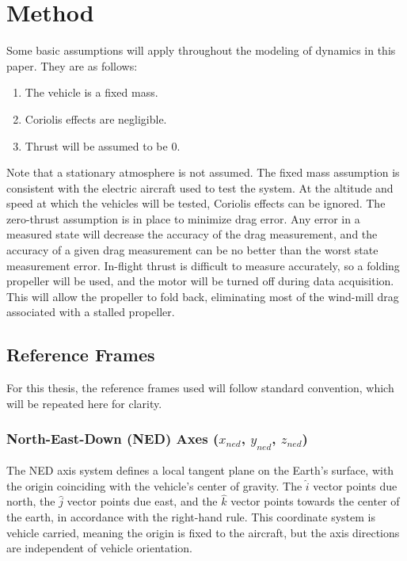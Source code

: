 \chapter{Method}
\label{background-information}
Some basic assumptions will apply throughout the modeling of dynamics in this paper. They are as follows:
\begin{enumerate}
\item The vehicle is a fixed mass.
\item Coriolis effects are negligible.
\item Thrust will be assumed to be 0.
\end{enumerate}
Note that a stationary atmosphere is not assumed. The fixed mass assumption is consistent with the electric aircraft used to test the system. At the altitude and speed at which the vehicles will be tested, Coriolis effects can be ignored\cite{klein2006aircraft}. The zero-thrust assumption is in place to minimize drag error. Any error in a measured state will decrease the accuracy of the drag measurement, and the accuracy of a given drag measurement can be no better than the worst state measurement error. In-flight thrust is difficult to measure accurately, so a folding propeller will be used, and the motor will be turned off during data acquisition. This will allow the propeller to fold back, eliminating most of the wind-mill drag associated with a stalled propeller. 

\section{Reference Frames}
For this thesis, the reference frames used will follow standard convention,\cite{klein2006aircraft} which will be repeated here for clarity.

\subsection*{North-East-Down (NED) Axes ($x_{ned}$, $y_{ned}$, $z_{ned}$)}
The NED axis system defines a local tangent plane on the Earth's surface, with the origin coinciding with the vehicle's center of gravity. The $\hat{i}$ vector points due north, the $\hat{j}$ vector points due east, and the $\hat{k}$ vector points towards the center of the earth, in accordance with the right-hand rule. This coordinate system is vehicle carried, meaning the origin is fixed to the aircraft, but the axis directions are independent of vehicle orientation.

